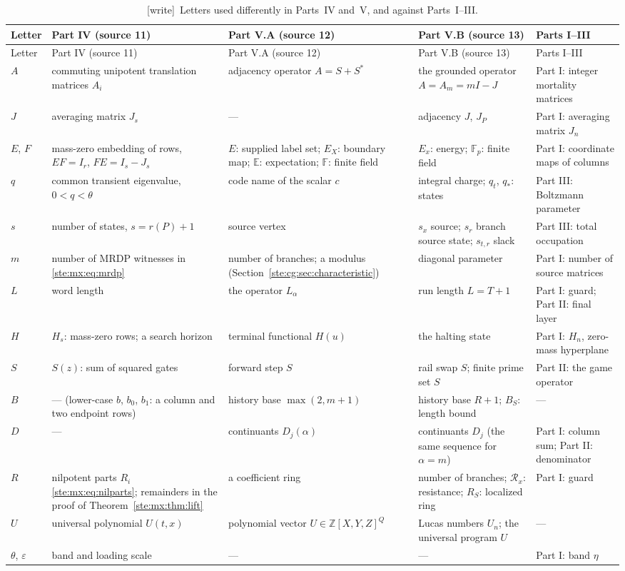 \documentclass[11pt,letterpaper]{article}
\theoremstyle{definition}
\theoremstyle{remark}
\newcommand{\Z}{\mathbb Z}
\newcommand{\F}{\mathbb F}
\newcommand{\E}{\mathbb E}
\newcommand{\wtag}{\textup{[write]}}
\begin{document}
\begin{longtable}{@{}L{0.075\textwidth}L{0.2\textwidth}L{0.2\textwidth}L{0.2\textwidth}L{0.2\textwidth}@{}}
\caption{\wtag\ Letters used differently in Parts~IV and~V, and against Parts~I--III.}\label{ste:tab:notation79}\\
\toprule
Letter & Part IV (source 11) & Part V.A (source 12) & Part V.B (source 13) & Parts I--III\\
\midrule
\endfirsthead
\toprule
Letter & Part IV (source 11) & Part V.A (source 12) & Part V.B (source 13) & Parts I--III\\
\midrule
\endhead
\bottomrule
\endfoot
$A$ & commuting unipotent translation matrices $A_i$ & adjacency operator $A=S+S^*$ & the grounded operator $A=A_m=mI-J$ & Part I: integer mortality matrices\\
$J$ & averaging matrix $J_s$ & --- & adjacency $J$, $J_P$ & Part I: averaging matrix $J_n$\\
$E$, $F$ & mass-zero embedding of rows, $EF=I_r$, $FE=I_s-J_s$ & $E$: supplied label set; $E_X$: boundary map; $\E$: expectation; $\F$: finite field & $E_x$: energy; $\F_p$: finite field & Part I: coordinate maps of columns\\
$q$ & common transient eigenvalue, $0<q<\theta$ & code name of the scalar $c$ & integral charge; $q_t$, $q_*$: states & Part III: Boltzmann parameter\\
$s$ & number of states, $s=r(P)+1$ & source vertex & $s_x$ source; $s_r$ branch source state; $s_{t,r}$ slack & Part III: total occupation\\
$m$ & number of MRDP witnesses in \eqref{ste:mx:eq:mrdp} & number of branches; a modulus (Section~\ref{ste:cg:sec:characteristic}) & diagonal parameter & Part I: number of source matrices\\
$L$ & word length & the operator $L_\alpha$ & run length $L=T+1$ & Part I: guard; Part II: final layer\\
$H$ & $H_s$: mass-zero rows; a search horizon & terminal functional $H(u)$ & the halting state & Part I: $H_n$, zero-mass hyperplane\\
$S$ & $S(z)$: sum of squared gates & forward step $S$ & rail swap $S$; finite prime set $S$ & Part II: the game operator\\
$B$ & --- (lower-case $b$, $b_0$, $b_1$: a column and two endpoint rows) & history base $\max(2,m+1)$ & history base $R+1$; $B_S$: length bound & ---\\
$D$ & --- & continuants $D_j(\alpha)$ & continuants $D_j$ (the same sequence for $\alpha=m$) & Part I: column sum; Part II: denominator\\
$R$ & nilpotent parts $R_i$ \eqref{ste:mx:eq:nilparts}; remainders in the proof of Theorem~\ref{ste:mx:thm:lift} & a coefficient ring & number of branches; $\mathcal R_x$: resistance; $R_S$: localized ring & Part I: guard\\
$U$ & universal polynomial $U(t,x)$ & polynomial vector $U\in\Z[X,Y,Z]^Q$ & Lucas numbers $U_n$; the universal program $U$ & ---\\
$\theta$, $\varepsilon$ & band and loading scale & --- & --- & Part I: band $\eta$\\
\end{longtable}
\end{document}
